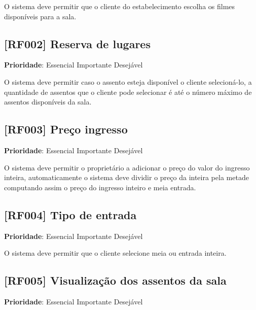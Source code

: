 \documentclass[12pt,a4paper]{article}
\begin{document}
O sistema deve permitir que o cliente do estabelecimento escolha os filmes disponíveis
para a sala.

\subsection{[RF002] Reserva de lugares}

\textbf{Prioridade}:
\mbox{\ooalign{$\checkmark$\cr\hidewidth$\square$\hidewidth\cr}} Essencial
\mbox{\ooalign{\cr\hidewidth$\square$\hidewidth\cr}} Importante
\mbox{\ooalign{\cr\hidewidth$\square$\hidewidth\cr}} Desejável

O sistema deve permitir caso o assento esteja disponível o cliente selecioná-lo,
a quantidade de assentos que o cliente pode selecionar é até o número máximo de
assentos disponíveis da sala.


\subsection{[RF003] Preço ingresso}

\textbf{Prioridade}:
\mbox{\ooalign{$\checkmark$\cr\hidewidth$\square$\hidewidth\cr}} Essencial
\mbox{\ooalign{\cr\hidewidth$\square$\hidewidth\cr}} Importante
\mbox{\ooalign{\cr\hidewidth$\square$\hidewidth\cr}} Desejável

O sistema deve permitir o proprietário a adicionar o preço do valor do
ingresso inteira, automaticamente o sistema deve dividir o preço da inteira
pela metade computando assim o preço do ingresso inteiro e meia entrada.

\subsection{[RF004] Tipo de entrada}

\textbf{Prioridade}:
\mbox{\ooalign{$\checkmark$\cr\hidewidth$\square$\hidewidth\cr}} Essencial
\mbox{\ooalign{\cr\hidewidth$\square$\hidewidth\cr}} Importante
\mbox{\ooalign{\cr\hidewidth$\square$\hidewidth\cr}} Desejável

O sistema deve permitir que o cliente selecione meia ou entrada inteira.

\subsection{[RF005] Visualização dos assentos da sala}

\textbf{Prioridade}:
\mbox{\ooalign{$\checkmark$\cr\hidewidth$\square$\hidewidth\cr}} Essencial
\mbox{\ooalign{\cr\hidewidth$\square$\hidewidth\cr}} Importante
\mbox{\ooalign{\cr\hidewidth$\square$\hidewidth\cr}} Desejável
\end{document}
